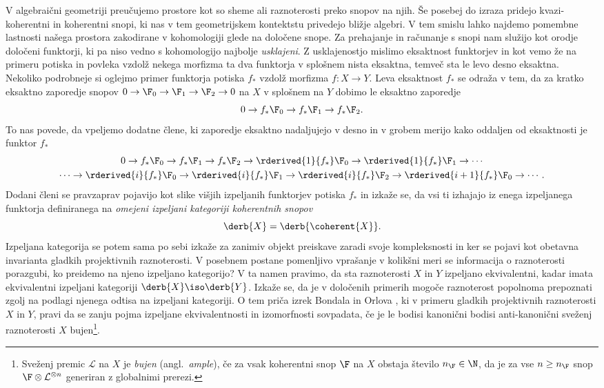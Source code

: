 

V algebraični geometriji preučujemo prostore kot so sheme ali raznoterosti preko snopov na njih. Še posebej do izraza pridejo kvazi-koherentni in koherentni snopi, ki nas v tem geometrijskem kontektstu privedejo bližje algebri. V tem smislu lahko najdemo pomembne lastnosti našega prostora zakodirane v kohomologiji glede na določene snope.
Za prehajanje in računanje s snopi nam služijo kot orodje določeni funktorji, ki pa niso vedno s kohomologijo najbolje \emph{usklajeni}. 
Z usklajenostjo mislimo eksaktnost funktorjev in kot vemo že na primeru potiska in povleka vzdolž nekega morfizma ta dva funktorja v splošnem nista eksaktna, temveč sta le levo \oz desno eksaktna. Nekoliko podrobneje si oglejmo primer funktorja potiska $f_*$ vzdolž morfizma $f \colon X \to Y$. Leva eksaktnost $f_*$ se odraža v tem, da za kratko eksaktno zaporedje snopov $0 \to \F_0 \to \F_1 \to \F_2 \to 0$ na $X$ v splošnem na $Y$ dobimo le eksaktno zaporedje
\[
    0 \to f_*\F_0 \to f_*\F_1 \to f_*\F_2.
\]
To nas povede, da vpeljemo dodatne člene, ki zaporedje eksaktno nadaljujejo v desno in v grobem merijo kako oddaljen od eksaktnosti je funktor $f_*$
\begin{multline*}
    0 \to f_*\F_0 \to f_*\F_1 \to f_*\F_2 \to \rderived{1}{f_*}\F_0 \to \rderived{1}{f_*}\F_1 \to \cdots \\
    \cdots \to \rderived{i}{f_*}\F_0 \to \rderived{i}{f_*}\F_1 \to \rderived{i}{f_*}\F_2 \to \rderived{i+1}{f_*}\F_0 \to \cdots.
\end{multline*}
Dodani členi se pravzaprav pojavijo kot slike višjih izpeljanih funktorjev potiska $f_*$ in izkaže se, da vsi ti izhajajo iz enega izpeljanega funktorja definiranega na \emph{omejeni izpeljani kategoriji koherentnih snopov}
\[
    \derb{X} = \derb{\coherent{X}}.
\]
Izpeljana kategorija se potem sama po sebi izkaže za zanimiv objekt preiskave zaradi svoje kompleksnosti in ker se pojavi kot obetavna invarianta gladkih projektivnih raznoterosti. V posebnem postane pomenljivo vprašanje v kolikšni meri se informacija o raznoterosti porazgubi, ko preidemo na njeno izpeljano kategorijo?  V ta namen pravimo, da sta raznoterosti $X$ in $Y$ izpeljano ekvivalentni, kadar imata ekvivalentni izpeljani kategoriji $\derb{X}\iso \derb{Y}$. Izkaže se, da je v določenih primerih mogoče raznoterost popolnoma prepoznati zgolj na podlagi njenega odtisa na izpeljani kategoriji. O tem priča izrek Bondala in Orlova \cite{BondalOrlov2001}, ki v primeru gladkih projektivnih raznoterosti $X$ in $Y$, pravi da se zanju pojma izpeljane ekvivalentnosti in izomorfnosti sovpadata, če je le bodisi kanonični bodisi anti-kanonični sveženj raznoterosti $X$ bujen\footnote{
    Sveženj premic $\mathcal L$ na $X$ je \emph{bujen} (angl.~\emph{ample}), če za vsak koherentni snop $\F$ na $X$ obstaja število $n_\F \in \N$, da je za vse $n \geq n_\F$ snop $\F \otimes \mathcal L^{\otimes n}$ generiran z globalnimi prerezi.
}.
